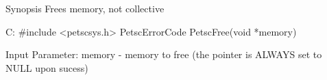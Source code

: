 Synopsis
Frees memory, not collective

C:
#include <petscsys.h>
PetscErrorCode PetscFree(void *memory)

Input Parameter:
memory - memory to free (the pointer is ALWAYS set to NULL upon sucess)
